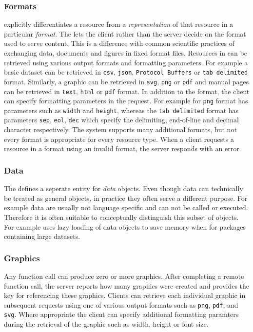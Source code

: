 \subsubsection{Formats}

\OpenCPU explicitly differentiates a resource from a \emph{representation} of that resource in a particular \emph{format}. The \API lets the client rather than the server decide on the format used to serve content. This is a difference with common scientific practices of exchanging data, documents and figures in fixed format files. Resources in \OpenCPU can be retrieved using various output formats and formatting parameters. For example a basic dataset can be retrieved in \texttt{csv}, \texttt{json}, \texttt{Protocol Buffers} or \texttt{tab delimited} format. Similarly, a graphic can be retrieved in \texttt{svg}, \texttt{png} or \texttt{pdf} and manual pages can be retrieved in \texttt{text}, \texttt{html} or \texttt{pdf} format. In addition to the format, the client can specify formatting parameters in the request. For example for \texttt{png} format has parameters such as \texttt{width} and \texttt{height}, whereas the \texttt{tab delimited} format has parameters \texttt{sep}, \texttt{eol}, \texttt{dec} which specify the delimiting, end-of-line and decimal character respectively. The system supports many additional formats, but not every format is appropriate for every resource type. When a client requests a resource in a format using an invalid format, the server responds with an error. 

\subsubsection{Data}

The \API defines a seperate entity for \emph{data} objects. Even though data can technically be treated as general objects, in practice they often serve a different purpose. For example data are usually not language specific and can not be called or executed. Therefore it is often suitable to conceptually distinguish this subset of objects. For example \R uses lazy loading of data objects to save memory when for packages containing large datasets.

\subsubsection{Graphics}

Any function call can produce zero or more graphics. After completing a remote function call, the server reports how many graphics were created and provides the key for referencing these graphics. Clients can retrieve each individual graphic in subsequent requests using one of various output formats such as \texttt{png}, \texttt{pdf}, and \texttt{svg}. Where appropriate the client can specify additional formatting paramters during the retrieval of the graphic such as width, height or font size.

